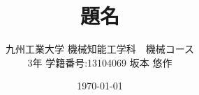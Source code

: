 \makeatletter
  \def\@maketitle{%
  \newpage\null
  \vskip 2em%
  \begin{center}%
  \let\footnote\thanks
    {\Large \@title \par}%
    \vskip 1.5em%
  \end{center}%
  \begin{flushright}
        \@author
  \end{flushright}
  \begin{flushright}%
    {\large \@date}%
  \end{flushright}%
  \par\vskip 1.5em}
\makeatother

\title{題名}
\author{九州工業大学 機械知能工学科　機械コース\\3年 学籍番号:13104069 坂本 悠作}
\date{\today}